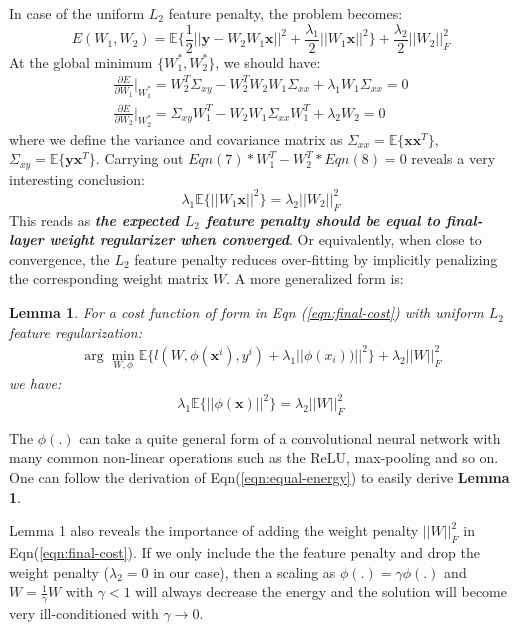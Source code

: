 In case of the uniform $L_2$ feature penalty, the problem becomes:
\begin{equation}
E(W_1,W_2)=\mathbb{E}\{\frac{1}{2}||\mathbf{y}-W_2W_1\mathbf{x}||^2+\frac{\lambda_1}{2}||W_1\mathbf{x}||^2\}+\frac{\lambda_2}{2}||W_2||_F^2
\end{equation}
At the global minimum $\{W_1^*,W_2^*\}$, we should have:
\begin{eqnarray}
\frac{\partial E}{\partial W_1}|_{W_1^*}=W^T_2\Sigma_{xy}-W^T_2W_2W_1\Sigma_{xx}
+\lambda_1W_1\Sigma_{xx}=0\\
\frac{\partial E}{\partial W_2}|_{W_2^*}=\Sigma_{xy}W_1^T-W_2W_1\Sigma_{xx}W_1^T+\lambda_2W_2=0
\end{eqnarray}
where we define the variance and covariance matrix as $\Sigma_{xx}=\mathbb{E}\{\mathbf{x}\mathbf{x}^T\}$, $\Sigma_{xy}=\mathbb{E}\{\mathbf{y}\mathbf{x}^T\}$.
Carrying out $Eqn(7)*W_1^T-W_2^T*Eqn(8)=0$ reveals a very interesting conclusion:
\begin{equation}
\lambda_1\mathbb{E}\{||W_1\mathbf{x}||^2\}=\lambda_2||W_2||_F^2
\label{eqn:equal-energy}
\end{equation}
This reads as \textit{\textbf{the expected $L_2$ feature penalty should be equal to final-layer weight regularizer when converged}}. Or equivalently, when close to convergence, the $L_2$ feature penalty reduces over-fitting by implicitly penalizing the corresponding weight matrix $W$. A more generalized form is:
\newtheorem{theorem}{Lemma}
\begin{theorem}
For a cost function of form in Eqn (\ref{eqn:final-cost}) with uniform $L_2$ feature regularization:
\begin{eqnarray*}
\arg\min_{W,\phi}\mathbb{E}\{l(W,\phi(\mathbf{x}^i),y^i)+\lambda_1||\phi(x_i))||^2\}+\lambda_2||W||_F^2
\end{eqnarray*}
we have:
\begin{equation}
\lambda_1\mathbb{E}\{||\phi(\mathbf{x})||^2\}=\lambda_2||W||_F^2
\end{equation}
\end{theorem}
The $\phi(.)$ can take a quite general form of a convolutional neural network with many common non-linear operations such as the ReLU, max-pooling and so on. One can follow the derivation of Eqn(\ref{eqn:equal-energy}) to easily derive \textbf{Lemma 1}.

Lemma 1 also reveals the importance of adding the weight penalty $||W||^2_F$ in Eqn(\ref{eqn:final-cost}). If we only include the the feature penalty and drop the weight penalty ($\lambda_2=0$ in our case), then a scaling as $\phi(.)=\gamma\phi(.)$ and $W=\frac{1}{\gamma}W$ with $\gamma<1$ will always decrease the energy and the solution will become very ill-conditioned with $\gamma\rightarrow 0$.